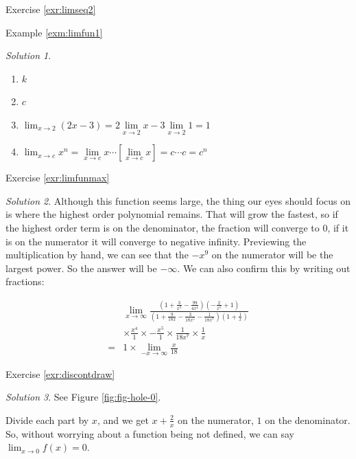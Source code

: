 \documentclass[
]{book}
\providecommand{\tightlist}{%
  \setlength{\itemsep}{0pt}\setlength{\parskip}{0pt}}
\theoremstyle{definition}
\theoremstyle{definition}
\theoremstyle{definition}
\theoremstyle{definition}
\theoremstyle{remark}
\newtheorem*{solution}{Solution}
\begin{document}
Exercise \ref{exr:limseq2}

Example \ref{exm:limfun1}

\begin{solution}
{}

\begin{enumerate}
\def\labelenumi{\arabic{enumi}.}
\tightlist
\item
  \(k\)
\item
  \(c\)
\item
  \(\lim_{x\to 2} (2x-3) = 2\lim\limits_{x\to 2} x - 3\lim\limits_{x\to 2} 1 = 1\)
\item
  \(\lim_{x \to c} x^n = \lim\limits_{x \to c} x \cdots[\lim\limits_{x \to c} x] = c\cdots c =c^n\)
\end{enumerate}
\end{solution}

Exercise \ref{exr:limfunmax}

\begin{solution}
{}Although this function seems large, the thing our eyes should focus on is where the highest order polynomial remains. That will grow the fastest, so if the highest order term is on the denominator, the fraction will converge to 0, if it is on the numerator it will converge to negative infinity. Previewing the multiplication by hand, we can see that the \(-x^9\) on the numerator will be the largest power. So the answer will be \(-\infty\). We can also confirm this by writing out fractions:

\begin{align*}  
& \lim_{x\to\infty}\frac{\left(1 + \frac{3}{x^3} - \frac{99}{4x^4}\right)\left(-\frac{2}{x^5} + 1\right)}{\left(1 + \frac{9}{18x} - \frac{3}{18x^5} - \frac{1}{18x^7} \right)\left(1 + \frac{1}{x}\right)} \\
&\times \frac{x^4}{1} \times -\frac{x^5}{1} \times \frac{1}{18x^7}\times \frac{1}{x}\\
=& 1 \times \lim_{-x\to\infty} \frac{x}{18}
\end{align*}
\end{solution}

Exercise \ref{exr:discontdraw}

\begin{solution}
{}
See Figure \ref{fig:fig-hole-0}.

Divide each part by \(x\), and we get \(x + \frac{2}{x}\) on the numerator, \(1\) on the denominator. So, without worrying about a function being not defined, we can say \(\lim_{x\to 0}f(x) = 0\).
\end{solution}
\end{document}
